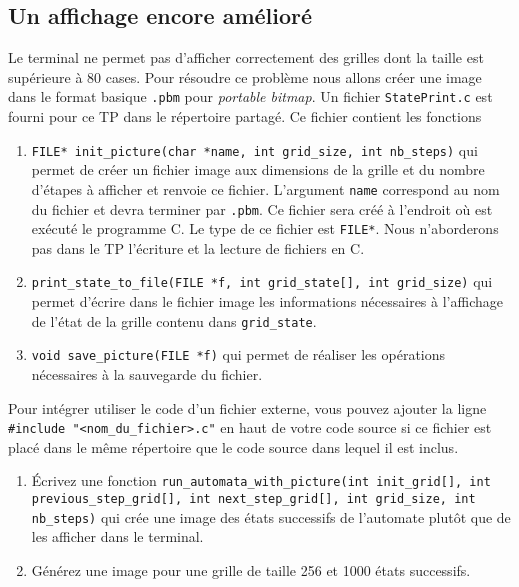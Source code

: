 \documentclass[11pt]{article}
\begin{document}
\subsection{Un affichage encore amélioré}
\label{sec:org2ef9096}
Le terminal ne permet pas d'afficher correctement des grilles dont la taille est supérieure à 80 cases. Pour résoudre ce problème nous allons créer une image dans le format basique \texttt{.pbm} pour \emph{portable bitmap}.
Un fichier \texttt{StatePrint.c} est fourni pour ce TP dans le répertoire partagé.
Ce fichier contient les fonctions
\begin{enumerate}
\item \texttt{FILE* init\_picture(char *name, int grid\_size, int nb\_steps)} qui permet de créer un fichier image aux dimensions de la grille et du nombre d'étapes à afficher et renvoie ce fichier. L'argument \texttt{name} correspond au nom du fichier et devra terminer par \texttt{.pbm}. Ce fichier sera créé à l'endroit où est exécuté le programme C. Le type de ce fichier est \texttt{FILE*}. Nous n'aborderons pas dans le TP l'écriture et la lecture de fichiers en C.
\item \texttt{print\_state\_to\_file(FILE *f, int grid\_state[], int grid\_size)} qui permet d'écrire dans le fichier image les informations nécessaires à l'affichage de l'état de la grille contenu dans \texttt{grid\_state}.
\item \texttt{void save\_picture(FILE *f)} qui permet de réaliser les opérations nécessaires à la sauvegarde du fichier.
\end{enumerate}
Pour intégrer utiliser le code d'un fichier externe, vous pouvez ajouter la ligne \texttt{\#include "<nom\_du\_fichier>.c"} en haut de votre code source si ce fichier est placé dans le même répertoire que le code source dans lequel il est inclus.
\begin{enumerate}
\item Écrivez une fonction \texttt{run\_automata\_with\_picture(int init\_grid[], int previous\_step\_grid[], int next\_step\_grid[], int grid\_size, int nb\_steps)} qui crée une image des états successifs de l'automate plutôt que de les afficher dans le terminal.
\item Générez une image pour une grille de taille 256 et 1000 états successifs.
\end{enumerate}
\end{document}
